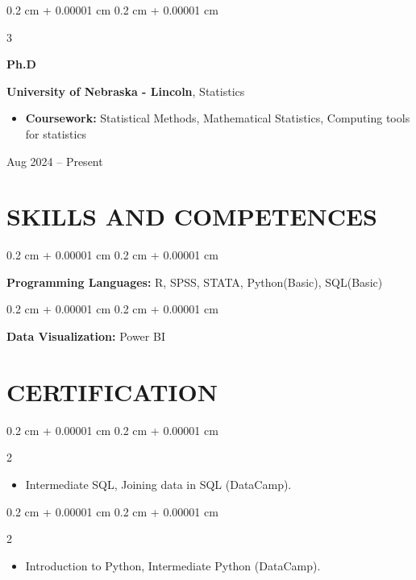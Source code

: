 \documentclass[10pt, letterpaper]{article}
\newenvironment{highlights}{
    \begin{itemize}[
        topsep=0.10 cm,
        parsep=0.10 cm,
        partopsep=0pt,
        itemsep=0pt,
        leftmargin=0.4 cm + 10pt
    ]
}{
    \end{itemize}
} %
\newenvironment{onecolentry}{
    \begin{adjustwidth}{
        0.2 cm + 0.00001 cm
    }{
        0.2 cm + 0.00001 cm
    }
}{
    \end{adjustwidth}
} %
\newenvironment{twocolentry}[2][]{
    \onecolentry
    \def\secondColumn{#2}
    \setcolumnwidth{\fill, 4.5 cm}
    \begin{paracol}{2}
}{
    \switchcolumn \raggedleft \secondColumn
    \end{paracol}
    \endonecolentry
} %
\newenvironment{threecolentry}[3][]{
    \onecolentry
    \def\thirdColumn{#3}
    \setcolumnwidth{1 cm, \fill, 4.5 cm}
    \begin{paracol}{3}
    {\raggedright #2} \switchcolumn
}{
    \switchcolumn \raggedleft \thirdColumn
    \end{paracol}
    \endonecolentry
} %
\begin{document}
         \begin{threecolentry}{\textbf{Ph.D}}{
            Aug 2024 – Present
        }
            \textbf{University of Nebraska - Lincoln}, Statistics
            \begin{highlights}
                \item \textbf{Coursework:} Statistical Methods, Mathematical Statistics, Computing tools for statistics
            \end{highlights}
        \end{threecolentry}



    \section{SKILLS AND COMPETENCES}

        
        \begin{onecolentry}
            \textbf{Programming Languages:} R, SPSS, STATA, Python(Basic), SQL(Basic)
        \end{onecolentry}

        \vspace{0.2 cm}

        \begin{onecolentry}
            \textbf{Data Visualization:} Power BI
        \end{onecolentry}



    \section{CERTIFICATION}

 
    \begin{twocolentry}{
       2023
        }
            \begin{highlights}
                \item Intermediate SQL, Joining data in SQL (DataCamp).
            \end{highlights}
        \end{twocolentry}


     \begin{twocolentry}{
       2023
        }
            \begin{highlights}
                \item Introduction to Python, Intermediate Python (DataCamp).
            \end{highlights}
        \end{twocolentry}
\end{document}
